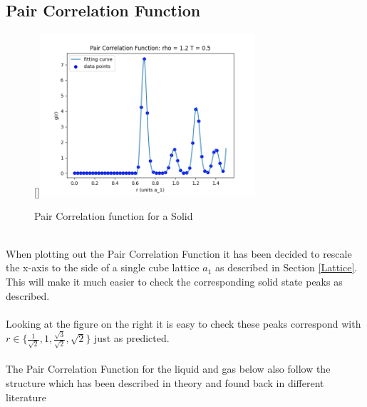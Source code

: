 \documentclass[a4paper,12pt]{article} %
\begin{document}
\subsection{Pair Correlation Function}
\begin{figure}
\raisebox{0pt}[\dimexpr{}\baselineskip\relax]{\includegraphics[width=8cm]{Data/pair_correlation_Solid.png}}
\caption{Pair Correlation function for a Solid}
\end{figure}\\
When plotting out the Pair Correlation Function it has been decided to rescale the x-axis to the side of a single cube lattice $a_1$ as described in Section \eqref{Lattice}.
This will make it much easier to check the corresponding solid state peaks as described.\\
\\
Looking at the figure on the right it is easy to check these peaks correspond with $r \in \{\frac{1}{\sqrt{2}}, 1, \frac{\sqrt{3}}{\sqrt{2}},\sqrt{2}\}$ just as predicted.\\
\\
The Pair Correlation Function for the liquid and gas below also follow the structure which has been described in theory and found back in different literature\cite{chandler}
\end{document}
